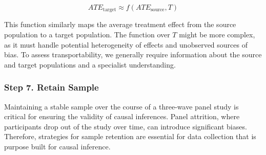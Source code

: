 \documentclass[
  singlecolumn,
  9pt]{article}
\begin{document}
\[ATE_{\text{target}} \approx f(ATE_{\text{source}}, T)\]

This function similarly maps the average treatment effect from the
source population to a target population. The function over \(T\) might
be more complex, as it must handle potential heterogeneity of effects
and unobserved sources of bias. To assess transportability, we generally
require information about the source and target populations and a
specialist understanding.

\subsubsection{Step 7. Retain Sample}\label{step-7.-retain-sample}

Maintaining a stable sample over the course of a three-wave panel study
is critical for ensuring the validity of causal inferences. Panel
attrition, where participants drop out of the study over time, can
introduce significant biases. Therefore, strategies for sample retention
are essential for data collection that is purpose built for causal
inference.
\end{document}
